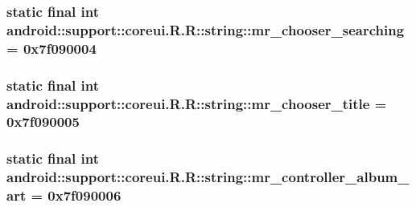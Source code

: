 \hypertarget{classandroid_1_1support_1_1coreui_1_1_r_1_1string_eb9a2a7245a04eabdbeefe25a35497d5}{
\subsubsection[{mr\_\-chooser\_\-searching}]{\setlength{\rightskip}{0pt plus 5cm}static final int android::support::coreui.R.R::string::mr\_\-chooser\_\-searching = 0x7f090004}}
\label{classandroid_1_1support_1_1coreui_1_1_r_1_1string_eb9a2a7245a04eabdbeefe25a35497d5}


\hypertarget{classandroid_1_1support_1_1coreui_1_1_r_1_1string_52c8946810b855f8c425d818b38eba97}{
\subsubsection[{mr\_\-chooser\_\-title}]{\setlength{\rightskip}{0pt plus 5cm}static final int android::support::coreui.R.R::string::mr\_\-chooser\_\-title = 0x7f090005}}
\label{classandroid_1_1support_1_1coreui_1_1_r_1_1string_52c8946810b855f8c425d818b38eba97}


\hypertarget{classandroid_1_1support_1_1coreui_1_1_r_1_1string_06408ee1e7e4e7c8749dd679fc1e1ecb}{
\subsubsection[{mr\_\-controller\_\-album\_\-art}]{\setlength{\rightskip}{0pt plus 5cm}static final int android::support::coreui.R.R::string::mr\_\-controller\_\-album\_\-art = 0x7f090006}}
\label{classandroid_1_1support_1_1coreui_1_1_r_1_1string_06408ee1e7e4e7c8749dd679fc1e1ecb}


